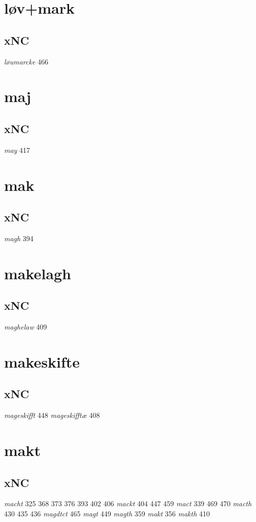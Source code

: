 \documentclass[a4paper,twocolumn]{article}
\begin{document}
\section{løv+mark}
\label{sec:org4bbdf1e}
\subsection{xNC}
\label{sec:orgd383bc0}
\emph{løumarcke} 466 
\section{maj}
\label{sec:org1eeedd2}
\subsection{xNC}
\label{sec:org48ee4c6}
\emph{may} 417 
\section{mak}
\label{sec:org6c0c539}
\subsection{xNC}
\label{sec:org92537a4}
\emph{magh} 394 
\section{makelagh}
\label{sec:orgb07d563}
\subsection{xNC}
\label{sec:org559f257}
\emph{maghelaw} 409 
\section{makeskifte}
\label{sec:org31dfc51}
\subsection{xNC}
\label{sec:orgfe04e30}
\emph{mageskifft} 448 \emph{mageskifftæ} 408 
\section{makt}
\label{sec:org28e2d58}
\subsection{xNC}
\label{sec:org67fb26c}
\emph{macht} 325 368 373 376 393 402 406 \emph{mackt} 404 447 459 \emph{mact} 339 469 470 \emph{macth} 430 435 436 \emph{magdtct} 465 \emph{magt} 449 \emph{magth} 359 \emph{makt} 356 \emph{makth} 410 
\end{document}
